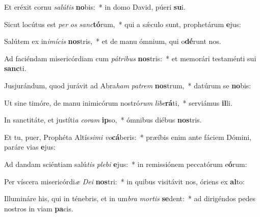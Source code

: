 \item Et eréxit cornu \textit{sa}\textit{lú}\textit{tis} \textbf{no}bis:~* in domo David, púeri \textbf{su}i.
\item Sicut locútus est \textit{per} \textit{os} \textit{sanc}\textbf{tó}rum,~* qui a sǽculo sunt, prophetárum \textbf{e}jus:
\item Salútem ex in\textit{i}\textit{mí}\textit{cis} \textbf{nos}tris,~* et de manu ómnium, qui o\textbf{dé}runt nos.
\item Ad faciéndam misericórdiam cum \textit{pá}\textit{tri}\textit{bus} \textbf{nos}tris:~* et memorári testaménti sui \textbf{sanc}ti.
\item Jusjurándum, quod jurávit ad Abra\textit{ham} \textit{pa}\textit{trem} \textbf{nos}trum,~* datúrum se \textbf{no}bis:
\item Ut sine timóre, de manu inimicórum nostró\textit{rum} \textit{li}\textit{be}\textbf{rá}ti,~* serviámus \textbf{il}li.
\item In sanctitáte, et justíti\textit{a} \textit{co}\textit{ram} \textbf{ip}so,~* ómnibus diébus \textbf{nos}tris.
\item Et tu, puer, Prophéta Altís\textit{si}\textit{mi} \textit{vo}\textbf{cá}beris:~* præíbis enim ante fáciem Dómini, paráre vias \textbf{e}jus:
\item Ad dandam sciéntiam salú\textit{tis} \textit{ple}\textit{bi} \textbf{e}jus:~* in remissiónem peccatórum e\textbf{ó}rum:
\item Per víscera misericórdi\textit{æ} \textit{De}\textit{i} \textbf{nos}tri:~* in quibus visitávit nos, óriens ex \textbf{al}to:
\item Illumináre his, qui in ténebris, et in um\textit{bra} \textit{mor}\textit{tis} \textbf{se}dent:~* ad dirigéndos pedes nostros in viam \textbf{pa}cis.

